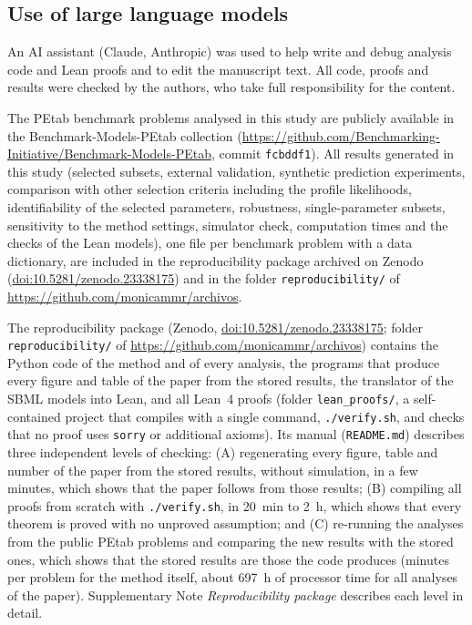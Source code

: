 \documentclass[pdflatex,sn-nature]{sn-jnl}
\theoremstyle{plain}
\newcommand{\zenododoi}{10.5281/zenodo.23338175}
\begin{document}
\subsection*{Use of large language models}

An AI assistant (Claude, Anthropic) was used to help write and debug analysis code and Lean proofs and to edit the manuscript text. All code, proofs and results were checked by the authors, who take full responsibility for the content.

\backmatter

The PEtab benchmark problems analysed in this study are publicly available in the Benchmark-Models-PEtab collection (\url{https://github.com/Benchmarking-Initiative/Benchmark-Models-PEtab}, commit \texttt{fcbddf1}). All results generated in this study (selected subsets, external validation, synthetic prediction experiments, comparison with other selection criteria including the profile likelihoods, identifiability of the selected parameters, robustness, single-parameter subsets, sensitivity to the method settings, simulator check, computation times and the checks of the Lean models), one file per benchmark problem with a data dictionary, are included in the reproducibility package archived on Zenodo (\href{https://doi.org/\zenododoi}{doi:\zenododoi}) and in the folder \texttt{reproducibility/} of \url{https://github.com/monicammr/archivos}.

The reproducibility package (Zenodo, \href{https://doi.org/\zenododoi}{doi:\zenododoi}; folder \texttt{reproducibility/} of \url{https://github.com/monicammr/archivos}) contains the Python code of the method and of every analysis, the programs that produce every figure and table of the paper from the stored results, the translator of the SBML models into Lean, and all Lean~4 proofs (folder \texttt{lean\_proofs/}, a self-contained project that compiles with a single command, \texttt{./verify.sh}, and checks that no proof uses \texttt{sorry} or additional axioms). Its manual (\texttt{README.md}) describes three independent levels of checking: (A) regenerating every figure, table and number of the paper from the stored results, without simulation, in a few minutes, which shows that the paper follows from those results; (B) compiling all proofs from scratch with \texttt{./verify.sh}, in 20~min to 2~h, which shows that every theorem is proved with no unproved assumption; and (C) re-running the analyses from the public PEtab problems and comparing the new results with the stored ones, which shows that the stored results are those the code produces (minutes per problem for the method itself, about 697~h of processor time for all analyses of the paper). Supplementary Note \textit{Reproducibility package} describes each level in detail.
\end{document}
